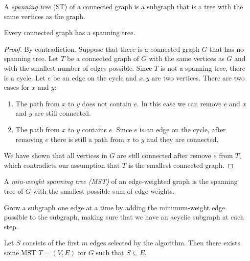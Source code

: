 \documentclass[11pt]{article}
\begin{document}
\begin{definition}
A \emph{spanning tree} (ST) of a connected graph is a subgraph that is a tree with the same vertices
as the graph.
\end{definition}

\begin{theorem}
Every connected graph has a spanning tree.
\end{theorem}

\begin{proof}
By contradiction. Suppose that there is a connected graph $G$ that has no spanning tree. Let $T$ be
a connected graph of $G$ with the same vertices as $G$ and with the smallest number of edges
possible. Since $T$ is not a spanning tree, there is a cycle. Let $e$ be an edge on the cycle and
$x,y$ are two vertices. There are two cases for $x$ and $y$:
\begin{enumerate}
\item The path from $x$ to $y$ does not contain $e$. In this case we can remove $e$ and $x$ and $y$
are still connected.
\item The path from $x$ to $y$ contains $e$. Since $e$ is an edge on the cycle, after removing $e$
there is still a path from $x$ to $y$ and they are connected.
\end{enumerate}
We have shown that all vertices in $G$ are still connected after remove $e$ from $T$, which
contradicts our assumption that $T$ is the smallest connected graph.
\end{proof}

\begin{definition}
A \emph{min-weight spanning tree (MST)} of an edge-weighted graph is the spanning tree of $G$ with
the smallest possible sum of edge weights.
\end{definition}

\begin{definition}
Grow a subgraph one edge at a time by adding the minimum-weight edge possible to the subgraph,
making sure that we have an acyclic subgraph at each step.
\end{definition}

\begin{lemma} \label{lemma:83}
Let $S$ consists of the first $m$ edges selected by the algorithm. Then there exists some MST $T=
(V,E)$ for $G$ such that $S \subseteq E$.
\end{lemma}
\end{document}
